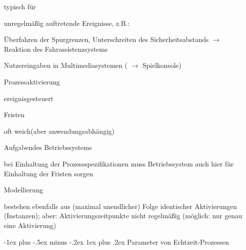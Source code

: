 \documentclass[a4paper]{article}
\makeatletter
\renewcommand{\subsubsection}{\@startsection{subsubsection}{3}{0mm}%
 {-1ex plus -.5ex minus -.2ex}%
 {1ex plus .2ex}%
 {\normalfont\small\bfseries}}
\makeatother
\begin{document}
\begin{multicols}{3}
    \begin{itemize*}
        \item
        typisch für
        \begin{itemize*}
            \item unregelmäßig auftretende Ereignisse, z.B.: \begin{itemize*} \item Überfahren der Spurgrenzen, Unterschreiten des Sicherheitsabstands $\rightarrow$ Reaktion des Fahrassistenzsystems \item Nutzereingaben in Multimediasystemen ( $\rightarrow$ Spielkonsole) \end{itemize*}
        \end{itemize*}
        \item
        Prozessaktivierung
        \begin{itemize*}
            \item ereignisgesteuert
        \end{itemize*}
        \item
        Fristen
        \begin{itemize*}
            \item oft weich(aber anwendungsabhängig)
        \end{itemize*}
        \item
        Aufgabendes Betriebssystems
        \begin{itemize*}
            \item bei Einhaltung der Prozessspezifikationen muss Betriebssystem auch hier für Einhaltung der Fristen sorgen
        \end{itemize*}
        \item
        Modellierung
        \begin{itemize*}
            \item bestehen ebenfalls aus (maximal unendlicher) Folge identischer Aktivierungen (Instanzen); aber: Aktivierungszeitpunkte nicht regelmäßig (möglich: nur genau eine Aktivierung)
        \end{itemize*}
    \end{itemize*}


    \subsubsection{Parameter von
        Echtzeit-Prozessen}


\end{multicols}
\end{document}
